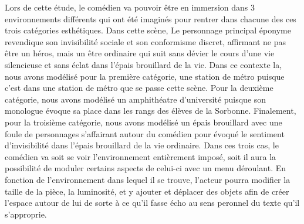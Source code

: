 Lors de cette étude, le comédien va pouvoir être en immersion dans 3 environnements différents qui ont été imaginés pour rentrer
dans chacune des ces trois catégories esthétiques. Dans cette scène, Le personnage principal éponyme revendique son invisibilité 
sociale et son conformisme discret, affirmant ne pas être un héros, mais un être ordinaire qui suit sans dévier le cours d'une vie
silencieuse et sans éclat dans l'épais brouillard de la vie. Dans ce contexte la, nous avons modélisé pour la première catégorie, une 
station de métro puisque c'est dans une station de métro que se passe cette scène. Pour la deuxième catégorie, nous avons modélisé un
amphithéatre d'université puisque son monologue évoque sa place dans les rangs des élèves de la Sorbonne. Finalement, pour la troisième 
catégorie, nous avons modélisé un épais brouillard avec une foule de personnages s'affairant autour du comédien pour évoqué le sentiment d'invisibilité dans l'épais brouillard de la vie ordinaire.
Dans ces trois cas, le comédien va soit se voir l'environnement entièrement imposé, soit il aura la possibilité de moduler certains aspects
de celui-ci avec un menu déroulant. En fonction de l'environnement dans lequel il se trouve, l'acteur pourra modifier la taille de la pièce, la luminosité, et
y ajouter et déplacer des objets afin de créer l'espace autour de lui de sorte à ce qu'il fasse écho au sens peronnel du texte qu'il s'approprie. 

